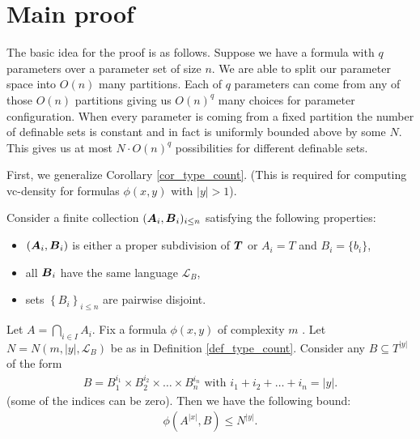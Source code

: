 \documentclass{amsart}
\DeclareMathOperator{\TT}{\boldface T}
\DeclareMathOperator{\AT}{\boldface A}
\DeclareMathOperator{\BT}{\boldface B}
\renewcommand{\LL}{\mathcal L}
\newcommand{\curly}[1]{\left\{#1\right\}}
\begin{document}
\section{Main proof}

The basic idea for the proof is as follows.
Suppose we have a formula with $q$ parameters over a parameter set of size $n$.
We are able to split our parameter space into $O(n)$ many partitions. Each of $q$ parameters can come from any of those $O(n)$ partitions giving us $O(n)^q$ many choices for parameter configuration. When every parameter is coming from a fixed partition the number of definable sets is constant and in fact is uniformly bounded above by some $N$. This gives us at most $N \cdot O(n)^q$ possibilities for different definable sets.

First, we generalize Corollary \ref{cor_type_count}. (This is required for computing vc-density for formulas $\phi(x, y)$ with $|y| > 1$).

\begin{Lemma} \label{lm_partition_bound}
  Consider a finite collection $(\AT_i, \BT_i)_{i \leq n}$ satisfying the following properties:
  \begin{itemize}
  \item $(\AT_i, \BT_i)$ is either a proper subdivision of $\TT$ or $A_i = T$ and $B_i = \{b_i\}$,
  \item all $\BT_i$ have the same language $\LL_B$,
  \item sets $\curly{B_i}_{i \leq n}$ are pairwise disjoint.
  \end{itemize}
  Let $A = \bigcap_{i \in I} A_i$.
  Fix a formula $\phi(x, y)$ of complexity $m$ . Let $N = N(m, |y|, \LL_B)$ be as in Definition \ref{def_type_count}. Consider any $B \subseteq T^{|y|}$ of the form
  \begin{align*}
    B = B_1^{i_1} \times B_2^{i_2} \times \ldots \times B_n^{i_n} \text { with } i_1 + i_2 + \ldots + i_n = |y|.
  \end{align*}
  (some of the indices can be zero). Then we have the following bound:
  \begin{align*}
    \phi(A^{|x|}, B) \leq N^{|y|}.
  \end{align*}
\end{Lemma}
\end{document}
